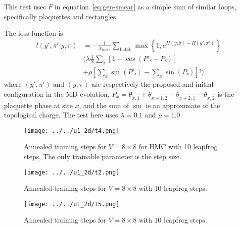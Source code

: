 This test uses $F$ in equation~\eqref{eq:gen-smear} as a simple sum of similar loops,
specifically plaquettes and rectangles.

The loss function is
\begin{equation}
\label{eq:loss}
\begin{split}
	l(y',π'|y,π) &= - \frac{1}{N_{\text{batch}}} \sum_{\text{batch}}
	\max\left\{1, e^{H(y,π)-H(y',π')}\right\} \\
	&\Bigg(
		λ \frac{1}{N} \sum_x \left[ 1-\cos\left(P'ₓ-Pₓ\right) \right] \\
		&+ ρ \left[ \sum_x \sin(P'ₓ)-\sum_x \sin(Pₓ) \right]²
	\Bigg),
\end{split}
\end{equation}
where $(y',π')$ and $(y,π)$ are respectively the proposed and initial configuration
in the MD evolution,
$P_x = θ_{x,\hat{1}} + θ_{x+\hat{1},\hat{2}} - θ_{x+\hat{2},\hat{1}} - θ_{x,\hat{2}}$ is the plaquette phase at site $x$,
and the sum of $\sin$ is an approximate of the topological charge.
The test here uses $λ=0.1$ and $ρ=1.0$.

\begin{figure}
	\centering
	\texttt{[image: ../../u1\_2d/t4.png]}
	\caption{\label{training-4}Annealed training steps for $V=8×8$ for HMC with 10 leapfrog steps,
	The only trainable parameter is the step size.}
\end{figure}

\begin{figure}
	\centering
	\texttt{[image: ../../u1\_2d/t2.png]}
	\caption{\label{training-2}Annealed training steps for $V=8×8$ with 10 leapfrog steps.}
\end{figure}

\begin{figure}
	\centering
	\texttt{[image: ../../u1\_2d/t5.png]}
	\caption{\label{training-5}Annealed training steps for $V=8×8$ with 10 leapfrog steps.}
\end{figure}
